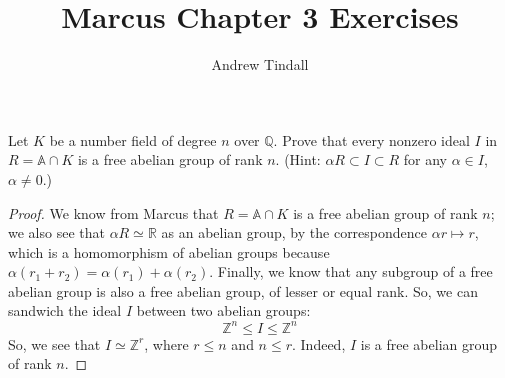 \documentclass[12pt]{article}
\newcommand{\Q}{\mathbb{Q}}
\newcommand{\Z}{\mathbb{Z}}
\newcommand{\R}{\mathbb{R}}
\theoremstyle{definition}
\newenvironment{problem}[2][Problem]{\begin{trivlist}
\item[\hskip \labelsep {\bfseries #1}\hskip \labelsep {\bfseries #2.}]}{\end{trivlist}}
\begin{document}
 
 
\title{Marcus Chapter 3 Exercises}
\author{Andrew Tindall}
 
\maketitle
\begin{problem}{4}
	Let $K$ be a number field of degree $n$ over $\Q$. Prove that every nonzero ideal $I$ in $R = \mathbb A \cap K$ is a free abelian group of rank $n$. (Hint: $\alpha R \subset I \subset R$ for any $\alpha \in I$, $\alpha \neq 0$.)
	\begin{proof}
		We know from Marcus that $R = \mathbb A \cap K$ is a free abelian group of rank $n$; we also see that $\alpha R \simeq \R$ as an abelian group, by the correspondence $\alpha r \mapsto r $, which is a homomorphism of abelian groups because $\alpha(r_1 + r_2) = \alpha(r_1) + \alpha(r_2)$. 
		Finally, we know that any subgroup of a free abelian group is also a free abelian group, of lesser or equal rank. So, we can sandwich the ideal $I$ between two abelian groups:
		\[ \Z^n \leq I \leq \Z^n\]
		So, we see that $I \simeq \Z^r$, where $r \leq n$ and $n \leq r$. Indeed, $I$ is a free abelian group of rank $n$.
	\end{proof}
\end{problem}
\end{document}

